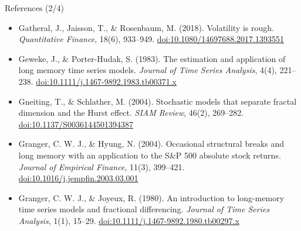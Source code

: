 \begin{frame}{References (2/4)}
\begin{itemize}
    \item Gatheral, J., Jaisson, T., \& Rosenbaum, M. (2018). Volatility is rough. \textit{Quantitative Finance}, 18(6), 933--949. \href{https://doi.org/10.1080/14697688.2017.1393551}{doi:10.1080/14697688.2017.1393551}
    \item Geweke, J., \& Porter-Hudak, S. (1983). The estimation and application of long memory time series models. \textit{Journal of Time Series Analysis}, 4(4), 221--238. \href{https://doi.org/10.1111/j.1467-9892.1983.tb00371.x}{doi:10.1111/j.1467-9892.1983.tb00371.x}
    \item Gneiting, T., \& Schlather, M. (2004). Stochastic models that separate fractal dimension and the Hurst effect. \textit{SIAM Review}, 46(2), 269--282. \href{https://doi.org/10.1137/S0036144501394387}{doi:10.1137/S0036144501394387}
    \item Granger, C. W. J., \& Hyung, N. (2004). Occasional structural breaks and long memory with an application to the S\&P 500 absolute stock returns. \textit{Journal of Empirical Finance}, 11(3), 399--421. \href{https://doi.org/10.1016/j.jempfin.2003.03.001}{doi:10.1016/j.jempfin.2003.03.001}
    \item Granger, C. W. J., \& Joyeux, R. (1980). An introduction to long-memory time series models and fractional differencing. \textit{Journal of Time Series Analysis}, 1(1), 15--29. \href{https://doi.org/10.1111/j.1467-9892.1980.tb00297.x}{doi:10.1111/j.1467-9892.1980.tb00297.x}
\end{itemize}
\end{frame}

